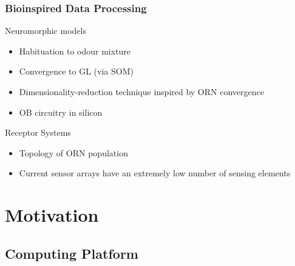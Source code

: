 \documentclass{beamer}
\newcommand{\mancite}[1]{{\scriptsize{\textbf{\color{MainGreen}{[#1] }}}}}
\begin{document}
\begin{frame}
\frametitle{Bioinspired Data Processing}
Neuromorphic models
\begin{itemize}
  \item Habituation to odour mixture \mancite{Gutierrez-Osuna, 2005}
  \item Convergence to GL (via SOM) \mancite{Raman and Gutierrez-Osuna, 2006}
  \item Dimensionality-reduction technique inspired by ORN convergence \mancite {Perera, 2006}
  \item OB circuitry in silicon \mancite{Pearce, 2005}
\end{itemize}
    
Receptor Systems
\begin{itemize}
  \item Topology of ORN population \mancite{Gill and Pearce, 2005}
  \item Current sensor arrays have an extremely low number of sensing elements \mancite{Gardner, 2006}
\end{itemize}
\end{frame}

\section{Motivation}

\subsection{Computing Platform}
\end{document}
